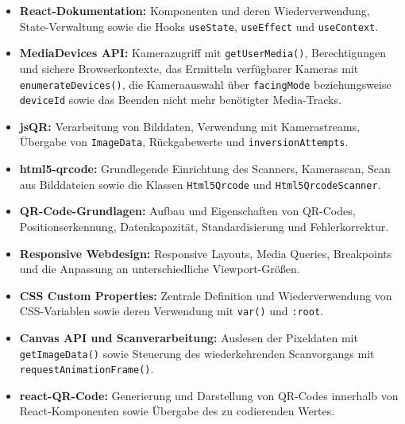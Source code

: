 ﻿\documentclass[oneside]{ausarbeitung}
\begin{document}
\begin{itemize}
    \item \textbf{React-Dokumentation:}
    Komponenten und deren Wiederverwendung, State-Verwaltung sowie die Hooks \texttt{useState}, \texttt{useEffect} und \texttt{useContext}.
    \autocite{reactQuickStart,reactHooks}

   \item \textbf{MediaDevices API:}
    Kamerazugriff mit \texttt{getUserMedia()}, Berechtigungen und sichere Browserkontexte, das Ermitteln verfügbarer Kameras mit
    \texttt{enumerateDevices()}, die Kameraauswahl über \texttt{facingMode} beziehungsweise \texttt{deviceId} sowie das Beenden
    nicht mehr benötigter Media-Tracks.
    \autocite{mdnGetUserMedia,mdnEnumerateDevices,mdnFacingMode,mdnMediaStreamTrackStop}

    \item \textbf{jsQR:}
    Verarbeitung von Bilddaten, Verwendung mit Kamerastreams, Übergabe von \texttt{ImageData}, Rückgabewerte und
    \texttt{inversionAttempts}.
    \autocite{jsQrDocs}

    \item \textbf{html5-qrcode:}
    Grundlegende Einrichtung des Scanners, Kamerascan, Scan aus Bilddateien sowie die Klassen \texttt{Html5Qrcode} und 
    \texttt{Html5QrcodeScanner}.
    \autocite{html5QrcodeDocs}

    \item \textbf{QR-Code-Grundlagen:}
    Aufbau und Eigenschaften von QR-Codes, Positionserkennung, Datenkapazität, Standardisierung und Fehlerkorrektur.
    \autocite{densoQrCode}

    \item \textbf{Responsive Webdesign:}
    Responsive Layouts, Media Queries, Breakpoints und die Anpassung an unterschiedliche Viewport-Größen.
    \autocite{mdnResponsiveDesign}

    \item \textbf{CSS Custom Properties:}
    Zentrale Definition und Wiederverwendung von CSS-Variablen sowie deren Verwendung mit \texttt{var()} und \texttt{:root}.
    \autocite{mdnCssCustomProperties}

    \item \textbf{Canvas API und Scanverarbeitung:}
    Auslesen der Pixeldaten mit \texttt{getImageData()} sowie Steuerung des wiederkehrenden Scanvorgangs mit
    \texttt{requestAnimationFrame()}.
    \autocite{mdnGetImageData,mdnRequestAnimationFrame}

    \item \textbf{react-QR-Code:}
    Generierung und Darstellung von QR-Codes innerhalb von React-Komponenten sowie Übergabe des zu codierenden Wertes.
    \autocite{reactQrCode}

\end{itemize}
\end{document}
